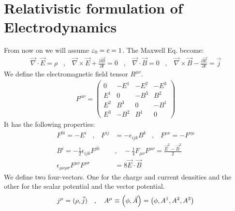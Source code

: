 \section{Relativistic formulation of Electrodynamics}

From now on we will assume $\varepsilon_0 = c = 1$. The Maxwell Eq. become:
\begin{align*}
    \vec{\nabla} \cdot \vec{E} = \rho
    \hspace{10pt} , \hspace{10pt}
    \vec{\nabla} \times \vec{E} + \frac{\partial \vec{B}}{\partial t} = 0
    \hspace{10pt} , \hspace{10pt}
    \vec{\nabla} \cdot \vec{B} = 0
    \hspace{10pt} , \hspace{10pt}
    \vec{\nabla} \times \vec{B} - \frac{\partial \vec{E}}{\partial t} = \vec{j}
\end{align*}
We define the electromagnetic field tensor $R^{\mu \nu}$.
\begin{align*}
    F^{\mu \nu} = \begin{pmatrix}
        0 & - E^1 & - E^2 & - E^3 \\
        E^1 & 0 & - B^3 & B^2 \\
        E^2 & B^3 & 0 & - B^1 \\
        E^3 & - B^2 & B^1 & 0
    \end{pmatrix}
\end{align*}
It has the following properties:
\begin{align*}
    F^{0i} = - E^i
    \hspace{10pt} , \hspace{10pt}
    F^{ij} &= - \epsilon_{ijk} B^k
    \hspace{10pt} , \hspace{10pt}
    F^{\mu \nu} = - F^{\nu \mu}
    \\
    B^i = - \frac{1}{2} \epsilon_{ijk} F^{jk}
    \hspace{10pt} &, \hspace{10pt}
    - \frac{1}{4} F_{\mu \nu} F^{\mu \nu} = \frac{\vec{E}^2 - \vec{B}^2}{2}
    \\
    \epsilon_{\mu \nu \rho \sigma} F^{\mu \nu} F^{\rho \sigma} &= 8 \vec{E} \cdot \vec{B}
\end{align*}
We define two four-vectors. One for the charge and current densities and
the other for the scalar potential and the vector potential.
\begin{align*}
    j^\mu = (\rho,\vec{j})
    \hspace{10pt} , \hspace{10pt}
    A^\mu \equiv \left( \phi,\vec{A} \right) = \left( \phi,A^1,A^2,A^3 \right)
\end{align*}
